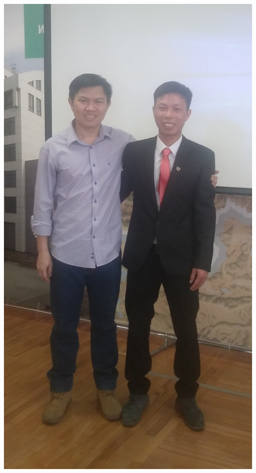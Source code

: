 \documentclass[10pt,dvipsnames]{beamer}
\begin{document}
\begin{frame}
\begin{columns}
\begin{column}{0.5\linewidth}
      \includegraphics[width=0.8\linewidth]{pics/the-and-student.jpg}
    \end{column}
  \end{columns}
\end{frame}
\end{document}
